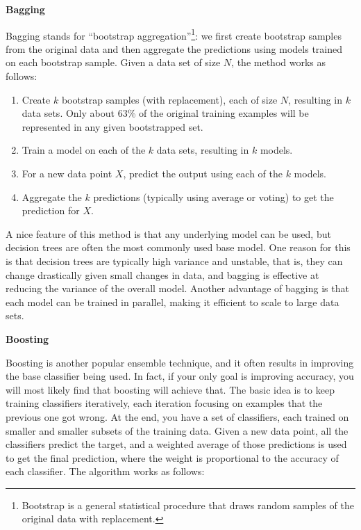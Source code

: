 \documentclass[]{krantz}
\begin{document}
\textbf{Bagging}

Bagging stands for ``bootstrap aggregation''\footnote{Bootstrap is a
  general statistical procedure that draws random samples of the
  original data with replacement.}: we first create bootstrap samples
from the original data and then aggregate the predictions using models
trained on each bootstrap sample. Given a data set of size \(N\), the
method works as follows:

\begin{enumerate}
\def\labelenumi{\arabic{enumi}.}
\item
  Create \(k\) bootstrap samples (with replacement), each of size \(N\),
  resulting in \(k\) data sets. Only about 63\% of the original training
  examples will be represented in any given bootstrapped set.
\item
  Train a model on each of the \(k\) data sets, resulting in \(k\)
  models.
\item
  For a new data point \(X\), predict the output using each of the \(k\)
  models.
\item
  Aggregate the \(k\) predictions (typically using average or voting) to
  get the prediction for \(X\).
\end{enumerate}

A nice feature of this method is that any underlying model can be used,
but decision trees are often the most commonly used base model. One
reason for this is that decision trees are typically high variance and
unstable, that is, they can change drastically given small changes in
data, and bagging is effective at reducing the variance of the overall
model. Another advantage of bagging is that each model can be trained in
parallel, making it efficient to scale to large data sets.

\textbf{Boosting}

Boosting is another popular ensemble technique, and it often results in
improving the base classifier being used. In fact, if your only goal is
improving accuracy, you will most likely find that boosting will achieve
that. The basic idea is to keep training classifiers iteratively, each
iteration focusing on examples that the previous one got wrong. At the
end, you have a set of classifiers, each trained on smaller and smaller
subsets of the training data. Given a new data point, all the
classifiers predict the target, and a weighted average of those
predictions is used to get the final prediction, where the weight is
proportional to the accuracy of each classifier. The algorithm works as
follows:
\end{document}
